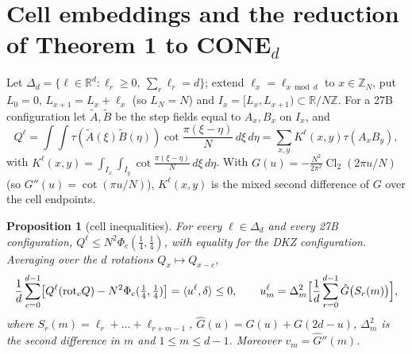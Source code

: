 \documentclass[11pt]{amsart}
\newtheorem{proposition}[theorem]{Proposition}
\theoremstyle{definition}
\theoremstyle{remark}
\numberwithin{equation}{section}
\newcommand{\R}{\mathbb{R}}
\newcommand{\Z}{\mathbb{Z}}
\newcommand{\Cl}{\operatorname{Cl}_2}
\begin{document}
\section{Cell embeddings and the reduction of Theorem 1 to \texorpdfstring{CONE$_d$}{CONE(d)}}\label{sec:cells}

Let $\Delta_d=\{\ell\in\R^d:\ell_r\ge0,\ \sum_r\ell_r=d\}$; extend $\ell_x=\ell_{x\bmod d}$ to $x\in\Z_N$, put $L_0=0$,
$L_{x+1}=L_x+\ell_x$ (so $L_N=N$) and $I_x=[L_x,L_{x+1})\subset\R/N\Z$. For a 27B configuration let $\tilde A,\tilde B$ be
the step fields equal to $A_x,B_x$ on $I_x$, and
\[
Q^\ell=\int\!\!\int\tau(\tilde A(\xi)\tilde B(\eta))\cot\frac{\pi(\xi-\eta)}{N}\,d\xi\,d\eta=\sum_{x,y}K^\ell(x,y)\tau(A_xB_y),
\]
with $K^\ell(x,y)=\int_{I_x}\int_{I_y}\cot\frac{\pi(\xi-\eta)}N\,d\xi\,d\eta$.
With $G(u)=-\frac{N^2}{2\pi^2}\Cl(2\pi u/N)$ (so $G''(u)=\cot(\pi u/N)$), $K^\ell(x,y)$ is the mixed second difference
of $G$ over the cell endpoints.

\begin{proposition}[cell inequalities]\label{prop:cells}
For every $\ell\in\Delta_d$ and every 27B configuration, $Q^\ell\le N^2\Phi_c(\frac14,\frac14)$, with equality for the
DKZ configuration. Averaging over the $d$ rotations $Q_x\mapsto Q_{x-c}$,
\begin{equation}\label{eq:cellineq}
\frac1d\sum_{c=0}^{d-1}\bigl[Q^\ell(\mathrm{rot}_cQ)-N^2\Phi_c(\tfrac14,\tfrac14)\bigr]=\langle u^\ell,\delta\rangle\le0,\qquad
u^\ell_m=\Delta^2_m\Bigl[\frac1d\sum_{r=0}^{d-1}\hat G\bigl(S_r(m)\bigr)\Bigr],
\end{equation}
where $S_r(m)=\ell_r+\dots+\ell_{r+m-1}$, $\hat G(u)=G(u)+G(2d-u)$, $\Delta^2_m$ is the second difference in $m$ and
$1\le m\le d-1$. Moreover $v_m=\hat G''(m)$.
\end{proposition}
\end{document}
